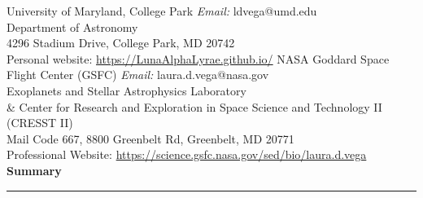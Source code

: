 \documentclass[letter,12pt]{article}
\begin{document}
{\noindent University of Maryland, College Park \hfill \textit{Email:} ldvega@umd.edu \\
\noindent Department of Astronomy \hfill \\
4296 Stadium Drive, College Park, MD 20742 \hfill \\
Personal website: \href{https://LunaAlphaLyrae.github.io/}{https://LunaAlphaLyrae.github.io/}
\vskip 0.1in
\noindent NASA Goddard Space Flight Center (GSFC) \hfill \textit{Email:} laura.d.vega@nasa.gov \\ 
Exoplanets and Stellar Astrophysics Laboratory \\ \& Center for Research and Exploration in Space Science and Technology II (CRESST II) \hfill \\
Mail Code 667, 8800 Greenbelt Rd, Greenbelt, MD 20771 \\
Professional Website: \href{https://science.gsfc.nasa.gov/sed/bio/laura.d.vega}{https://science.gsfc.nasa.gov/sed/bio/laura.d.vega} \\


}
\noindent
{\bf Summary} \\
\vspace{-10mm}
\begin{center}
\rule{\textwidth}{0.2mm}
\end{center}
\vspace{-3mm}

\end{document}

